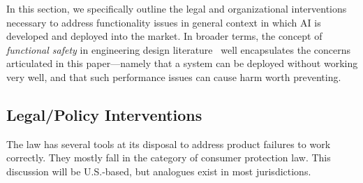 \documentclass[acmconf,manuscript,screen,natbib=true]{acmart}
\begin{document}
In this section, we specifically outline the legal and organizational interventions necessary to address functionality issues in general context in which AI is developed and deployed into the market. In broader terms, the concept of \emph{functional safety} in engineering design literature~\cite{smith2004functional,roland1991system} well encapsulates the concerns articulated in this paper---namely that a system can be deployed without working very well, and that such performance issues can cause harm worth preventing. 


\subsection{Legal/Policy Interventions}

The law has several tools at its disposal to address product failures to work correctly. They mostly fall in the category of consumer protection law. This discussion will be U.S.-based, but analogues exist in most jurisdictions.
\end{document}
